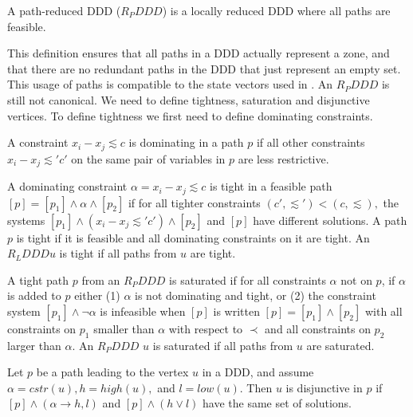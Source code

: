 \begin{mydef}
A path-reduced DDD ($R_PDDD$) is a locally reduced DDD where all paths are feasible.
\end{mydef}

This definition ensures that all paths in a DDD actually represent a zone, and that there are no redundant paths in the DDD that just represent an empty set. This usage of paths is compatible to the state vectors used in \ltsmin{}. An $R_PDDD$ is still not canonical. We need to define tightness, saturation and disjunctive vertices. To define tightness we first need to define dominating constraints.

\begin{mydef}
A constraint $x_i - x_j \lesssim c$ is dominating in a path $p$ if all other constraints $x_i - x_j \lesssim' c'$ on the same pair of variables in $p$ are less restrictive.
\end{mydef}

\begin{mydef}
A dominating constraint $\alpha = x_i - x_j \lesssim c$ is tight in a feasible path $[p] = [p_1] \wedge \alpha \wedge [p_2]$ if for all tighter constraints $(c', \lesssim') < (c,\lesssim),$ the systems $[p_1] \wedge (x_i - x_j \lesssim' c') \wedge [p_2]$ and $[p]$ have different solutions. A path $p$ is tight if it is feasible and all dominating constraints on it are tight. An $R_LDDD u$ is tight if all paths from $u$ are tight. 
\end{mydef}

\begin{mydef}
A tight path $p$ from an $R_PDDD$ is saturated if for all constraints $\alpha$ not on $p$, if $\alpha$ is added to $p$ either (1) $\alpha$ is not dominating and tight, or (2) the constraint system $[p_1] \wedge \neg\alpha$ is infeasible when $[p]$ is written $[p] = [p_1] \wedge [p_2]$ with all constraints on $p_1$ smaller than $\alpha$ with respect to $\prec$ and all constraints on $p_2$ larger than $\alpha$. An $R_PDDD$ $u$ is saturated if all paths from $u$ are saturated.
\end{mydef}

\begin{mydef}
Let $p$ be a path leading to the vertex $u$ in a DDD, and assume $\alpha = cstr(u), h = high(u),$ and $l = low(u)$. Then $u$ is disjunctive in $p$ if $[p] \wedge (\alpha \rightarrow h,l)$ and $[p] \wedge (h \vee l)$ have the same set of solutions.
\end{mydef}


